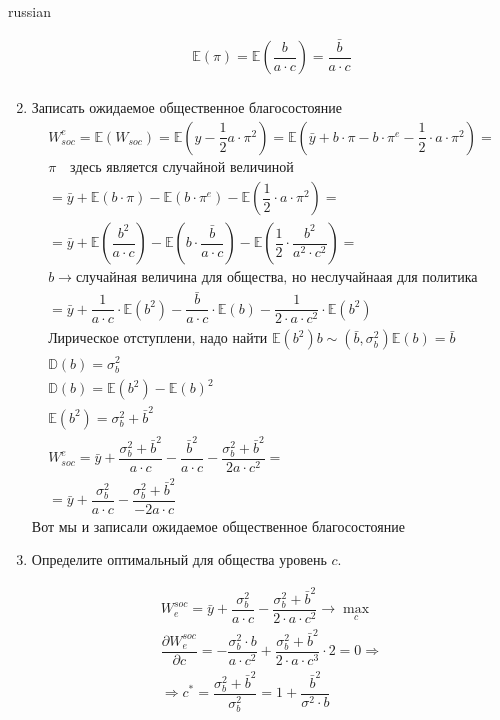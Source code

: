 \documentclass{article}
\begin{document}
\begin{otherlanguage*}{russian}
\begin{enumerate}
\begin{align*}
\mathbb{E} (\pi) = \mathbb{E} (\dfrac{b}{a \cdot c} ) = \dfrac{\bar{b}}{a \cdot c} \\
\end{align*}
\item Записать ожидаемое общественное благосостояние
\begin{align*}
W^e_{soc} = \mathbb{E} (W_{soc} ) = \mathbb{E} (y - \dfrac{1}{2} a \cdot \pi^2) = \mathbb{E} (\bar{y} + b \cdot \pi - b \cdot \pi^e - \dfrac{1}{2} \cdot a \cdot \pi^2 ) =  \\
\pi \quad \text{здесь является случайной величиной}  \\
= \bar{y} + \mathbb{E} ( b \cdot \pi ) - \mathbb{E} (b \cdot \pi^e) - \mathbb{E} (\dfrac{1}{2} \cdot a \cdot \pi^2 ) = \\
= \bar{y} + \mathbb{E} (\dfrac{b^2}{a \cdot c} ) - \mathbb{E} (b \cdot \dfrac{\bar{b}}{a \cdot c }) - \mathbb{E} (\dfrac{1}{2} \cdot \dfrac{b^2}{a^2 \cdot c ^ 2 }) = \\
b \rightarrow \text{случайная величина для общества, но неслучайнаая для политика}  \\
= \bar{y} + \dfrac{1}{a \cdot c} \cdot \mathbb{E} (b^2) - \dfrac{\bar{b}}{a \cdot c} \cdot \mathbb{E} (b) - \dfrac{1}{2 \cdot a \cdot c ^ 2} \cdot \mathbb{E} (b^2) \\
\text{Лирическое отступлени, надо найти } \mathbb{E} (b^2) 
b \sim (\bar{b}, \sigma^2_b) 
\mathbb{E} (b) = \bar{b} \\
\mathbb{D} (b) = \sigma^2_b \\
\mathbb{D} (b) = \mathbb{E} (b^2) - \mathbb{E} (b)^2 \\
\mathbb{E} (b^2) = \sigma^2_b + \bar{b}^2 \\
W^e_{soc} = \bar{y} + \dfrac{\sigma^2_b + \bar{b}^2}{a \cdot c} - \dfrac{\bar{b}^2}{a \cdot c} - \dfrac{\sigma^2_b + \bar{b}^2 }{2 a \cdot c ^ 2 } = \\ = \bar{y} + \dfrac{\sigma^2_b}{a \cdot c } - \dfrac{\sigma^2_b + \bar{b}^2}{- 2 a \cdot c }
\end{align*}
Вот мы и записали ожидаемое общественное благосостояние 

\item Определите оптимальный для общества уровень $ c $. 

\begin{align*}
W^{soc}_{e} = \bar{y} + \dfrac{\sigma^2_b}{a \cdot c} - \dfrac{\sigma^2_b + \bar{b}^2}{2 \cdot a \cdot c ^2} \rightarrow \max_{c} \\
\dfrac{\partial W^{soc}_{e}}{\partial c} = - \dfrac{\sigma^2_b \cdot b}{a \cdot c ^ 2} + \dfrac{\sigma^2_b + \bar{b}^2}{2 \cdot a \cdot c ^ 3}  \cdot 2 = 0 \Rightarrow \\
\Rightarrow c^* = \dfrac{\sigma^2_b + \bar{b}^2}{\sigma^2_b} = 1 + \dfrac{\bar{b}^2}{\sigma^2 \cdot b}
\end{align*}
\end{enumerate}

\end{otherlanguage*}
\end{document}
